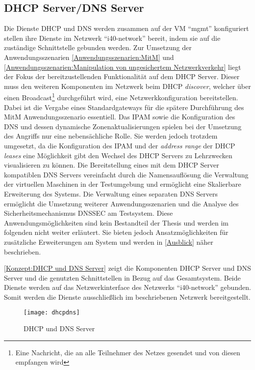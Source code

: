 \subsection{\ac{DHCP} Server/\ac{DNS} Server}
Die Dienste \ac{DHCP} und \ac{DNS} werden zusammen auf der \ac{VM} "`mgmt"' konfiguriert stellen ihre Dienste im Netzwerk "`i40-network"' bereit, indem sie auf die zuständige Schnittstelle gebunden werden. Zur Umsetzung der Anwendungsszenarien \autoref{Anwendungsszenarien:MitM} und \autoref{Anwendungsszenarien:Manipulation von ungesichertem Netzwerkverkehr} liegt der Fokus der bereitzustellenden Funktionalität auf dem \ac{DHCP} Server. Dieser muss den weiteren Komponenten im Netzwerk beim \ac{DHCP} \textit{discover}, welcher über einen Broadcast\footnote{Eine Nachricht, die an alle Teilnehmer des Netzes gesendet und von diesen empfangen wird} durchgeführt wird, eine Netzwerkkonfiguration bereitstellen. Dabei ist die Vergabe eines Standardgateways für die spätere Durchführung des \ac{MitM} Anwendungsszenario essentiell. Das \ac{IPAM} sowie die Konfiguration des \ac{DNS} und dessen dynamische Zonenaktualisierungen spielen bei der Umsetzung des Angriffs nur eine nebensächliche Rolle. Sie werden jedoch trotzdem umgesetzt, da die Konfiguration des \ac{IPAM} und der \textit{address range} der \ac{DHCP} \textit{leases} eine Möglichkeit gibt den Wechsel des \ac{DHCP} Servers zu Lehrzwecken visualisieren zu können. Die Bereitstellung eines mit dem \ac{DHCP} Server kompatiblen \ac{DNS} Servers vereinfacht durch die Namensauflösung die Verwaltung der virtuellen Maschinen in der Testumgebung und ermöglicht eine Skalierbare Erweiterung des Systems. Die Verwaltung eines separaten \ac{DNS} Servers ermöglicht die Umsetzung weiterer Anwendungsszenarien und die Analyse des Sicherheitsmechanismus \ac{DNSSEC} am Testsystem. Diese Anwendungsmöglichkeiten sind kein Bestandteil der Thesis und werden im folgenden nicht weiter erläutert. Sie bieten jedoch Ansatzmöglichkeiten für zusätzliche Erweiterungen am System und werden in \autoref{Ausblick} näher beschrieben.

\autoref{Konzept:DHCP und DNS Server} zeigt die Komponenten \ac{DHCP} Server und \ac{DNS} Server und die genutzten Schnittstellen in Bezug auf das Gesamtsystem. Beide Dienste werden auf das Netzwerkinterface des Netzwerks "`i40-network"' gebunden. Somit werden die Dienste ausschließlich im beschriebenen Netzwerk bereitgestellt.

\begin{figure}[h]
  \centering
  \texttt{[image: dhcpdns]}
  \caption{DHCP und DNS Server} 
  \label{Konzept:DHCP und DNS Server}
\end{figure}


